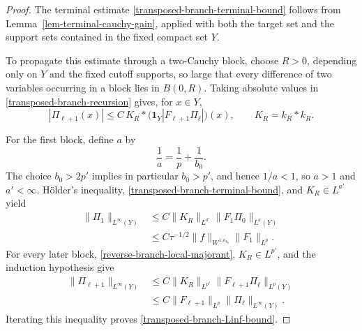 \documentclass[a4paper,11pt]{article}
\theoremstyle{plain}
\theoremstyle{definition}
\theoremstyle{remark}
\begin{document}
\begin{proof}
The terminal estimate \eqref{transposed-branch-terminal-bound} follows from
Lemma~\ref{lem-terminal-cauchy-gain}, applied with both the target set and the
support sets contained in the fixed compact set $Y$.

To propagate this estimate through a two-Cauchy block, choose $R>0$, depending only
on $Y$ and the fixed cutoff supports, so large that every difference of two
variables occurring in a block lies in $B(0,R)$.  Taking absolute values in
\eqref{transposed-branch-recursion} gives, for $x\in Y$,
\begin{equation}\label{reverse-branch-local-majorant}
        |\Pi_{\ell+1}(x)|
        \leq C\,K_R*
        \bigl(\mathbf 1_Y|F_{\ell+1}\Pi_\ell|\bigr)(x),
        \qquad K_R=k_R*k_R.
\end{equation}

For the first block, define $a$ by
\begin{equation}\label{reverse-branch-first-exponent}
        \frac1a=\frac1p+\frac1{b_0}.
\end{equation}
The choice $b_0>2p'$ implies in particular $b_0>p'$, and hence
$1/a<1$, so $a>1$ and $a'<\infty$.  H\"older's inequality,
\eqref{transposed-branch-terminal-bound}, and $K_R\in L^{a'}$ yield
\begin{align*}
 \|\Pi_1\|_{L^\infty(Y)}
 &\leq C\|K_R\|_{L^{a'}}
       \|F_1\Pi_0\|_{L^a(Y)}\\
 &\leq C\tau^{-1/2}\|f\|_{W^{1,a_{b_0}}}\|F_1\|_{L^p}.
\end{align*}
For every later block, \eqref{reverse-branch-local-majorant},
$K_R\in L^{p'}$, and the induction hypothesis give
\begin{align*}
 \|\Pi_{\ell+1}\|_{L^\infty(Y)}
 &\leq C\|K_R\|_{L^{p'}}
       \|F_{\ell+1}\Pi_\ell\|_{L^p(Y)}\\
 &\leq C\|F_{\ell+1}\|_{L^p}
       \|\Pi_\ell\|_{L^\infty(Y)}.
\end{align*}
Iterating this inequality proves \eqref{transposed-branch-Linf-bound}.
\end{proof}
\end{document}
